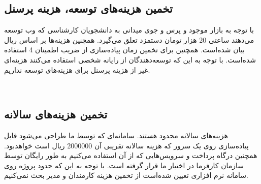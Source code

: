 \subsection* {تخمین هزینه‌های توسعه، هزینه پرسنل}
با توجه به بازار موجود و پرس و جوی میدانی به دانشجویان کارشناسی که وب توسعه می‌دهند ساعتی 20 هزار تومان دستمزد تعلق می‌گیرد. همچنین هزینه‌ها بر اساس ریال بیان شده‌است. همچنین برای تخمین زمان پیاده‌سازی از ضریب اطمینان 4 استفاده شده‌است. با توجه به این که توسعه‌دهندگان از رایانه شخصی استفاده می‌کنند هزینه‌ای غیر از هزینه پرسنل برای هزینه‌های توسعه نداریم. 
\begin{table}[h!]
\centering
{}
\end{table}
\\
\subsection* {تخمین هزینه‌های سالانه}
هزینه‌های سالانه محدود هستند. سامانه‌ای که توسط ما طراحی می‌شود قابل پیاده‌سازی روی یک سرور که هزینه سالانه تقریبی آن 2000000 ریال است خواهدبود. همچنین درگاه پرداخت و سرویس‌هایی که از آن استفاده می‌کنیم به طور رایگان توسط سازمان کارفرما در اختیار ما قرار گرفته است. با توجه به این که حدود پروژه روی سامانه نرم افزاری تعیین شده‌است از تخمین هزینه کارمندان و مدیر بحث نمی‌کنیم.